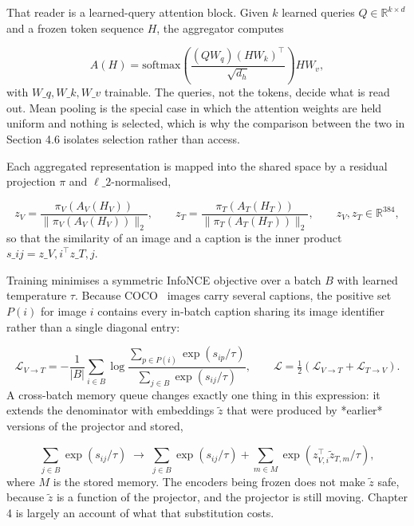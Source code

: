 \documentclass[11pt,a4paper,oneside]{report}
\begin{document}
That reader is a learned-query attention block. Given $k$ learned queries $Q \in \mathbb{R}^{k \times d}$ and a frozen token sequence $H$, the aggregator computes

\begin{equation*}
A(H) = \mathrm{softmax}\!\left(
  \frac{(QW_q)(HW_k)^{\top}}{\sqrt{d_h}}
\right) HW_v ,
\end{equation*}
with $W\_q, W\_k, W\_v$ trainable. The queries, not the tokens, decide what is read out. Mean pooling is the special case in which the attention weights are held uniform and nothing is selected, which is why the comparison between the two in Section 4.6 isolates selection rather than access.

Each aggregated representation is mapped into the shared space by a residual projection $\pi$ and $\ell\_2$-normalised,

\begin{equation*}
z_V = \frac{\pi_V(A_V(H_V))}{\lVert \pi_V(A_V(H_V)) \rVert_2},
\qquad
z_T = \frac{\pi_T(A_T(H_T))}{\lVert \pi_T(A_T(H_T)) \rVert_2},
\qquad
z_V, z_T \in \mathbb{R}^{384},
\end{equation*}
so that the similarity of an image and a caption is the inner product $s\_{ij} = z\_{V,i}^{\top} z\_{T,j}$.

Training minimises a symmetric InfoNCE objective over a batch $B$ with learned temperature $\tau$. Because COCO~\cite{lin2014coco} images carry several captions, the positive set $P(i)$ for image $i$ contains every in-batch caption sharing its image identifier rather than a single diagonal entry:

\begin{equation*}
\mathcal{L}_{V \rightarrow T}
= -\frac{1}{|B|} \sum_{i \in B} \log
\frac{\sum_{p \in P(i)} \exp(s_{ip} / \tau)}
     {\sum_{j \in B} \exp(s_{ij} / \tau)},
\qquad
\mathcal{L} = \tfrac{1}{2}\left(
  \mathcal{L}_{V \rightarrow T} + \mathcal{L}_{T \rightarrow V}
\right).
\end{equation*}
A cross-batch memory queue changes exactly one thing in this expression: it extends the denominator with embeddings $\tilde{z}$ that were produced by *earlier* versions of the projector and stored,

\begin{equation*}
\sum_{j \in B} \exp(s_{ij} / \tau)
\;\longrightarrow\;
\sum_{j \in B} \exp(s_{ij} / \tau)
+ \sum_{m \in M} \exp\!\left(z_{V,i}^{\top} \tilde{z}_{T,m} / \tau\right),
\end{equation*}
where $M$ is the stored memory. The encoders being frozen does not make $\tilde{z}$ safe, because $\tilde{z}$ is a function of the projector, and the projector is still moving. Chapter 4 is largely an account of what that substitution costs.
\end{document}
